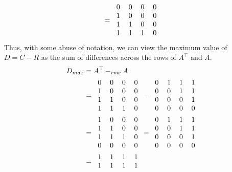 \documentclass{article}
\begin{document}
\begin{enumerate}
\begin{align*}
            = \begin{tabular}{cccc}
                0 & 0 & 0 & 0 \\
                1 & 0 & 0 & 0 \\
                1 & 1 & 0 & 0 \\
                1 & 1 & 1 & 0
            \end{tabular}
        \end{align*}
        Thus, with some abuse of notation, we can view the maximum value of $D = C - R$ as the sum of differences across the rows of $A^\top$ and $A$.
        \begin{align*}
            D_{max} &= A^\top -_{row} A \\
            &= \begin{tabular}{cccc}
                0 & 0 & 0 & 0 \\
                1 & 0 & 0 & 0 \\
                1 & 1 & 0 & 0 \\
                1 & 1 & 1 & 0
            \end{tabular}
            - \begin{tabular}{cccc}
                0 & 1 & 1 & 1 \\
                0 & 0 & 1 & 1 \\
                0 & 0 & 0 & 1 \\
                0 & 0 & 0 & 0
            \end{tabular} \\
            &= \begin{tabular}{cccc}
                1 & 0 & 0 & 0 \\
                1 & 1 & 0 & 0 \\
                1 & 1 & 1 & 0 \\
                0 & 0 & 0 & 0
            \end{tabular}
            - \begin{tabular}{cccc}
                0 & 1 & 1 & 1 \\
                0 & 0 & 1 & 1 \\
                0 & 0 & 0 & 1 \\
                0 & 0 & 0 & 0
            \end{tabular} \\
            &= \begin{tabular}{cccc}
                1 & 1 & 1 & 1 \\
                1 & 1 & 1 & 1 \\

\end{tabular}
\end{align*}
\end{enumerate}
\end{document}
